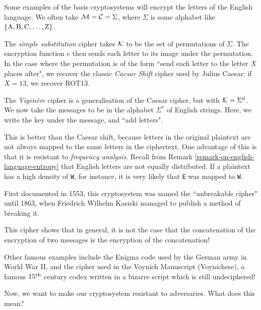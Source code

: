 \documentclass{article}
\begin{document}
\begin{example}
    Some examples of the basis cryptosystems will encrypt the letters of the English language. We often take $\mathcal{M} = \mathcal{C} = \Sigma$, where $\Sigma$ is some alphabet like $\left\lbrace \mathrm{A, B, C, \dots, Z} \right\rbrace$.
    
    The \textit{simple substitution} cipher takes $\mathcal{K}$ to be the set of permutations of $\Sigma$. The encryption function $e$ then sends each letter to its image under the permutation. In the case where the permutation is of the form ``send each letter to the letter $X$ places after", we recover the classic \textit{Caesar Shift} cipher used by Julius Caesar: if $X = 13$, we recover ROT13.
\end{example}

\begin{example}
    The \textit{Vigen\`ere} cipher is a generalisation of the Caesar cipher, but with $\mathcal{K} = \Sigma^d$. We now take the messages to be in the alphabet $\Sigma^*$ of English strings. Here, we write the key under the message, and ``add letters".
    
    This is better than the Caesar shift, because letters in the original plaintext are not always mapped to the same letters in the ciphertext. One advantage of this is that it is resistant to \textit{frequency analysis}. Recall from Remark \ref{remark-on-english-language-entropy} that English letters are not equally distributed. If a plaintext has a high density of \texttt{W}, for instance, it is very likely that \texttt{E} was mapped to \texttt{W}.
    
    First documented in 1553, this cryptosystem was named the ``unbreakable cipher" until 1863, when Friedrich Wilhelm Kasiski managed to publish a method of breaking it.
\end{example}

\begin{note}
	This cipher shows that in general, it is not the case that the concatenation of the encryption of two messages is the encryption of the concatenation!
\end{note}

Other famous examples include the Enigma code used by the German army in World War II, and the cipher used in the  Voynich Manuscript (Voynichese), a famous $15^{\text{th}}$ century codex written in a bizarre script which is still undeciphered!

Now, we want to make our cryptosystem resistant to adversaries. What does this mean?
\end{document}
